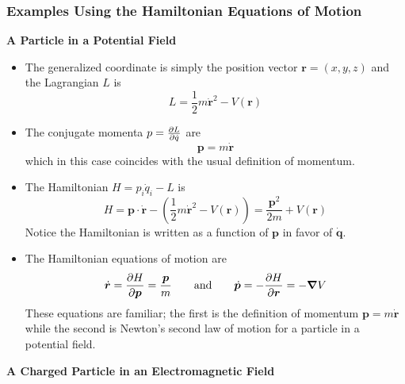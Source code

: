 \documentclass[11pt, a4paper]{article}
\newcommand{\eqtext}[1]{\qquad \text{#1} \qquad}
\newcommand{\bdot}[1]{\dot{\bm{#1}}} %
\begin{document}
\subsubsection{Examples Using the Hamiltonian Equations of Motion}
\textbf{A Particle in a Potential Field}
\begin{itemize}
	\item The generalized coordinate is simply the position vector $ \bm{r} = (x, y, z) $ and the Lagrangian $ L $ is
	\begin{equation*}
		L = \frac{1}{2}m\dot{\bm{r}}^{2} - V(\bm{r})
	\end{equation*}
	
	\item The conjugate momenta $ p = \pdv{L}{\dot{q}} $ are
	\begin{equation*}
		\bm{p} = m \dot{\bm{r}}
	\end{equation*}
	which in this case coincides with the usual definition of momentum.
	
	\item The Hamiltonian $ H = p_{i}\dot{q}_{i} - L $ is
	\begin{equation*}
		H = \bm{p}\cdot \dot{\bm{r}} - \left(\frac{1}{2}m\dot{\bm{r}}^{2} - V(\bm{r})\right) = \frac{\bm{p}^{2}}{2m} + V(\bm{r})
	\end{equation*}
	Notice the Hamiltonian is written as a function of $ \bm{p} $ in favor of $ \dot{\bm{q}} $.
	
	\item The Hamiltonian equations of motion are 
	\begin{equation*}
		\bdot{r} = \pdv{H}{\bm{p}} = \frac{\bm{p}}{m} \eqtext{and} \bdot{p} = - \pdv{H}{\bm{r}} = - \grad V
	\end{equation*}
	These equations are familiar; the first is the definition of momentum $ \bm{p} = m \bdot{r} $ while the second is Newton's second law of motion for a particle in a potential field.

\end{itemize}

\textbf{A Charged Particle in an Electromagnetic Field}
\end{document}
